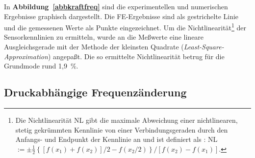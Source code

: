 In {\bf Abbildung~\ref{abbkraftfreq}} sind die experimentellen und
numerischen Ergebnisse graphisch dargestellt. Die FE-Ergebnisse sind
als gestrichelte Linie und die gemessenen Werte als Punkte eingezeichnet.
Um die Nichtlinearität\footnote{Die Nichtlinearität NL gibt die
maximale Abweichung einer nichtlinearen, stetig gekrümmten Kennlinie
von einer Verbindungsgeraden
durch den Anfangs- und Endpunkt der Kennlinie an und ist
definiert als \cite{Rei89}: NL$ := \pm \frac{1}{2} \left\{
[f(x_{1})+f(x_{2})]/2-f(x_{2}/2) \right\} / [f(x_{2})-f(x_{1})]$.}
der Sensorkennlinien zu ermitteln, wurde
an die Meßwerte eine lineare Ausgleichsgerade mit der Methode
der kleinsten Quadrate ({\em Least-Square-Approximation}) angepaßt. Die
so ermittelte Nichtlinearität betrug für die Grundmode rund 1,9~\%.



\subsection{Druckabhängige Frequenzänderung}
\label{druckabh}

